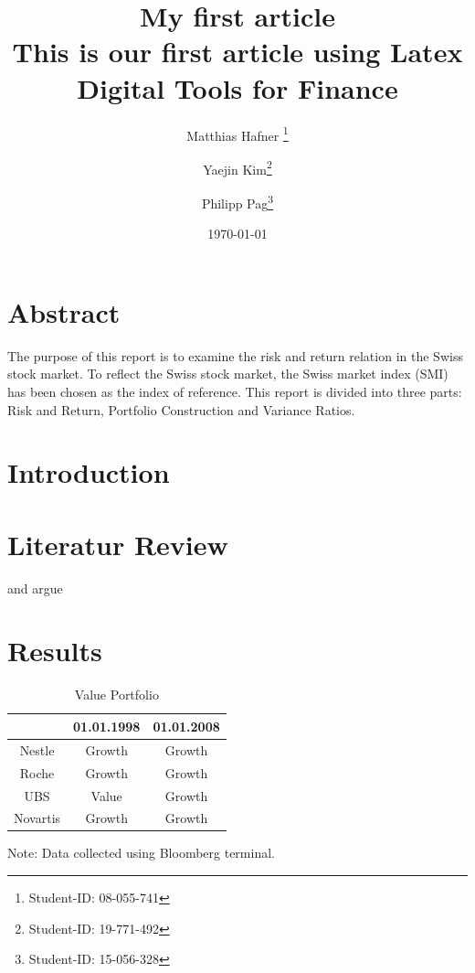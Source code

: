 \documentclass{article}
\begin{document}
	
	


\title{\Huge My first article  \\ \vspace*{0.5cm} \LARGE This is our first article using Latex \\ \vspace*{2cm} \Large \bf Digital Tools for Finance }
\author{Matthias Hafner \thanks{Student-ID: 08-055-741} \and Yaejin Kim\thanks{Student-ID: 19-771-492}  \and Philipp Pag\thanks{Student-ID: 15-056-328}}
\date{\today}
\maketitle
	
\vspace*{1cm}	
	
\section*{Abstract}

The purpose of this report is to examine the risk and return relation in the Swiss stock market. To reflect the Swiss stock market, the Swiss market index (SMI) has been chosen as the index of reference. This report is divided into three parts: Risk and Return, Portfolio Construction and Variance Ratios. \blindtext


\newpage


\tableofcontents
\newpage

\section{Introduction}
\blindtext
\newpage

\section{Literatur Review}

\cite{Milgrom1982} and \cite{Gormsen2020} argue \blindtext
\newpage

\section{Results}


\begin{table} [!h] \centering 
	\begin{threeparttable}
		\caption{Value Portfolio}
     	\begin{tabular}{ccc}
        	\toprule
				    	& 01.01.1998 & 01.01.2008\\ 
			\midrule
			Nestle  	& Growth 	& Growth \\
			Roche 		& Growth 	& Growth \\ 
			UBS 		& Value 	& Growth \\
			Novartis 	& Growth 	& Growth \\ 
			\bottomrule
		\end{tabular}
		\footnotesize Note: Data collected using Bloomberg terminal.
	\end{threeparttable}
\end{table}
\end{document}
